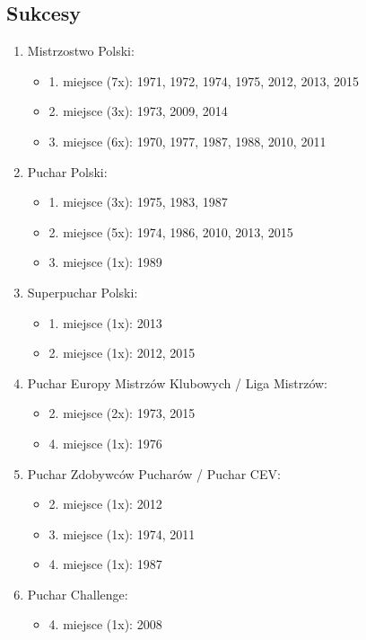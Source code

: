 \documentclass{article}
\begin{document}
\subsection{Sukcesy}
\begin{enumerate}
\item Mistrzostwo Polski:
\begin{itemize}
\item 1. miejsce (7x): 1971, 1972, 1974, 1975, 2012, 2013, 2015
\item 2. miejsce (3x): 1973, 2009, 2014
\item 3. miejsce (6x): 1970, 1977, 1987, 1988, 2010, 2011
\end{itemize}
\item Puchar Polski:
\begin{itemize}
\item 1. miejsce (3x): 1975, 1983, 1987
\item 2. miejsce (5x): 1974, 1986, 2010, 2013, 2015
\item 3. miejsce (1x): 1989
\end{itemize}
\item Superpuchar Polski:
\begin{itemize}
\item 1. miejsce (1x): 2013
\item 2. miejsce (1x): 2012, 2015
\end{itemize}
\item Puchar Europy Mistrzów Klubowych / Liga Mistrzów:
\begin{itemize}
\item 2. miejsce (2x): 1973, 2015
\item 4. miejsce (1x): 1976
\end{itemize}
\item Puchar Zdobywców Pucharów / Puchar CEV:
\begin{itemize}
\item 2. miejsce (1x): 2012
\item 3. miejsce (1x): 1974, 2011
\item 4. miejsce (1x): 1987
\end{itemize}
\item Puchar Challenge:
\begin{itemize}
\item 4. miejsce (1x): 2008
\end{itemize}
\end{enumerate}
\end{document}
